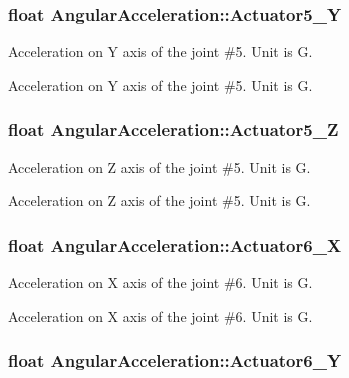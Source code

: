 \subsubsection[{\texorpdfstring{Actuator5\+\_\+Y}{Actuator5_Y}}]{\setlength{\rightskip}{0pt plus 5cm}float Angular\+Acceleration\+::\+Actuator5\+\_\+Y}\hypertarget{struct_angular_acceleration_a44a285d25040047b089f3d977a82546a}{}\label{struct_angular_acceleration_a44a285d25040047b089f3d977a82546a}


Acceleration on Y axis of the joint \#5. Unit is G. 

Acceleration on Y axis of the joint \#5. Unit is G. 
\subsubsection[{\texorpdfstring{Actuator5\+\_\+Z}{Actuator5_Z}}]{\setlength{\rightskip}{0pt plus 5cm}float Angular\+Acceleration\+::\+Actuator5\+\_\+Z}\hypertarget{struct_angular_acceleration_a9ba585569c14f9dec730713ad92cd25d}{}\label{struct_angular_acceleration_a9ba585569c14f9dec730713ad92cd25d}


Acceleration on Z axis of the joint \#5. Unit is G. 

Acceleration on Z axis of the joint \#5. Unit is G. 
\subsubsection[{\texorpdfstring{Actuator6\+\_\+X}{Actuator6_X}}]{\setlength{\rightskip}{0pt plus 5cm}float Angular\+Acceleration\+::\+Actuator6\+\_\+X}\hypertarget{struct_angular_acceleration_a285c6634d7542d3feaffcc6cc610db05}{}\label{struct_angular_acceleration_a285c6634d7542d3feaffcc6cc610db05}


Acceleration on X axis of the joint \#6. Unit is G. 

Acceleration on X axis of the joint \#6. Unit is G. 
\subsubsection[{\texorpdfstring{Actuator6\+\_\+Y}{Actuator6_Y}}]{\setlength{\rightskip}{0pt plus 5cm}float Angular\+Acceleration\+::\+Actuator6\+\_\+Y}\hypertarget{struct_angular_acceleration_a1f227cd43faadf267dde95ec75392311}{}\label{struct_angular_acceleration_a1f227cd43faadf267dde95ec75392311}



